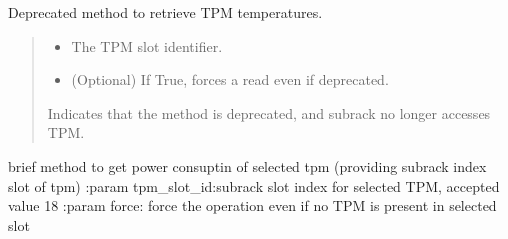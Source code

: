 \documentclass[letterpaper,10pt,english]{sphinxmanual}
\begin{document}
\begin{fulllineitems}
\begin{fulllineitems}
\end{fulllineitems}


\begin{fulllineitems}
\label{\detokenize{apidocs:subrack_management_board.SubrackMngBoard.GetTPMTemperatures}}
\pysigstartsignatures
{}
\pysigstopsignatures
\sphinxAtStartPar
Deprecated method to retrieve TPM temperatures.
\begin{quote}\begin{description}
\begin{itemize}
\item {} 
\sphinxAtStartPar
{} \textendash{} The TPM slot identifier.

\item {} 
\sphinxAtStartPar
{} \textendash{} (Optional) If True, forces a read even if deprecated.

\end{itemize}

\sphinxAtStartPar
{\hyperref[\detokenize{apidocs:subrack_management_board.SubrackExecFault}]{}} \textendash{} Indicates that the method is deprecated, and
subrack no longer accesses TPM.

\end{description}\end{quote}

\end{fulllineitems}


\begin{fulllineitems}
\label{\detokenize{apidocs:subrack_management_board.SubrackMngBoard.GetTPMVoltage}}
\pysigstartsignatures
{}
\pysigstopsignatures
\sphinxAtStartPar
brief method to get power consuptin of selected tpm (providing subrack index slot of tpm)
:param  tpm\_slot\_id:subrack slot index for selected TPM, accepted value 1\sphinxhyphen{}8
:param force: force the operation even if no TPM is present in selected slot


\end{fulllineitems}
\end{fulllineitems}
\end{document}
